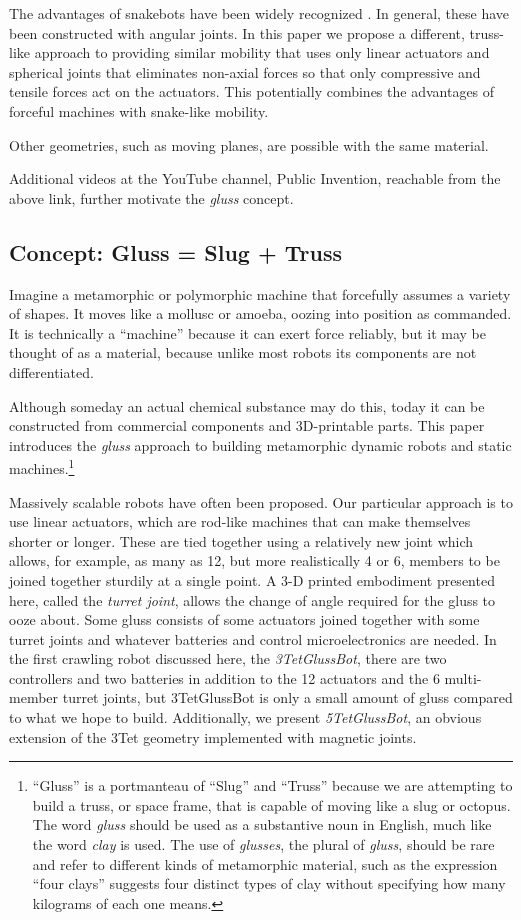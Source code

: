 \documentclass[11pt]{article}
\begin{document}
The advantages of snakebots have been widely recognized \cite{liljebäck2012snake}.
In general, these have been constructed
with angular joints. In this paper we propose a different, truss-like approach to providing similar
mobility that uses only linear actuators and spherical joints that eliminates non-axial forces so that only
compressive and tensile forces act on the actuators.
This potentially combines the advantages of forceful machines with snake-like mobility.


Other geometries, such as moving planes, are possible with the same material.

Additional videos at the YouTube channel, Public Invention, reachable from the above link,
further motivate the \emph{gluss} concept.


\subsection{Concept: Gluss = Slug + Truss}

Imagine a metamorphic or polymorphic machine that forcefully assumes a variety of shapes. It moves like a mollusc or amoeba,
oozing into position as commanded. It is technically a ``machine'' because it can exert force reliably, but
it may be thought of as a material, because unlike most robots its components are not differentiated.

Although someday an actual chemical substance may do this, today it can be constructed from commercial components
and 3D-printable parts. This paper introduces the \emph{gluss} approach to building metamorphic dynamic robots
and static machines.\footnote{ ``Gluss'' is a portmanteau of ``Slug'' and ``Truss'' because we are attempting to
build a truss, or space frame, that is capable of moving like a slug or octopus.
The word \textit{gluss}
should be used as a substantive noun in English, much like the word \textit{clay} is used.
The use of \textit{glusses}, the plural
of \textit{gluss}, should be rare and refer to different kinds of metamorphic material, such as the expression
``four clays'' suggests four distinct types of clay without specifying how many kilograms of each one means.}

Massively scalable robots have often been proposed. Our particular approach is to use linear actuators,
which are rod-like machines that can make themselves shorter or longer. These are tied together using
a relatively new joint \cite{song2003spherical} which allows, for example, as many as 12, but more realistically 4 or 6,
members to be joined together sturdily at a single point.
A 3-D printed embodiment presented here, called the \emph{turret joint}, allows the
change of angle required for the gluss to ooze about. Some gluss consists of some actuators joined together
with some turret joints and whatever batteries and control microelectronics are needed. In the first
crawling robot discussed here, the \emph{3TetGlussBot}, there are two controllers and two batteries
in addition to the 12 actuators and the 6 multi-member turret joints, but 3TetGlussBot is only
a small amount of gluss compared to what we hope to build. Additionally, we present \emph{5TetGlussBot}, an obvious extension of the
3Tet geometry implemented with magnetic joints.
\end{document}
